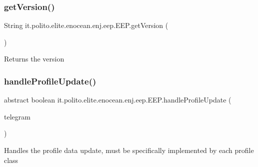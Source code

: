 \subsubsection{\texorpdfstring{get\+Version()}{getVersion()}}
{\footnotesize\ttfamily String it.\+polito.\+elite.\+enocean.\+enj.\+eep.\+E\+E\+P.\+get\+Version (\begin{DoxyParamCaption}{ }\end{DoxyParamCaption})}

\begin{DoxyReturn}{Returns}
the version 
\end{DoxyReturn}
\hypertarget{classit_1_1polito_1_1elite_1_1enocean_1_1enj_1_1eep_1_1_e_e_p_ac9e679e1f3266f640b7373a394bc0a19}{}\label{classit_1_1polito_1_1elite_1_1enocean_1_1enj_1_1eep_1_1_e_e_p_ac9e679e1f3266f640b7373a394bc0a19} 
\subsubsection{\texorpdfstring{handle\+Profile\+Update()}{handleProfileUpdate()}}
{\footnotesize\ttfamily abstract boolean it.\+polito.\+elite.\+enocean.\+enj.\+eep.\+E\+E\+P.\+handle\+Profile\+Update (\begin{DoxyParamCaption}\item[{\hyperlink{classit_1_1polito_1_1elite_1_1enocean_1_1enj_1_1eep_1_1eep26_1_1telegram_1_1_e_e_p26_telegram}{E\+E\+P26\+Telegram}}]{telegram }\end{DoxyParamCaption})\hspace{0.3cm}{\ttfamily [abstract]}}

Handles the profile data update, must be specifically implemented by each profile class \hypertarget{classit_1_1polito_1_1elite_1_1enocean_1_1enj_1_1eep_1_1_e_e_p_a8e1bc81c728b49915cbd061bdc1c60f2}{}\label{classit_1_1polito_1_1elite_1_1enocean_1_1enj_1_1eep_1_1_e_e_p_a8e1bc81c728b49915cbd061bdc1c60f2} 
